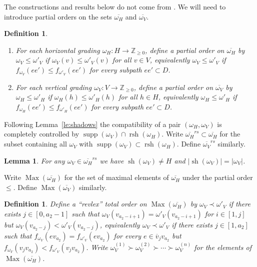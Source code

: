\documentclass{amsart}
\newtheorem{definition}[theorem]{Definition}
\newtheorem{lemma}[theorem]{Lemma}
\newcommand{\ZZ}{\mathbb{Z}}
\newcommand{\supp}{\operatorname{supp}}
\newcommand{\Max}{\operatorname{Max}}
\newcommand{\rsh}{\operatorname{rsh}}
\newcommand{\sh}{\operatorname{sh}}
\newenvironment{enumeratea}{\begin{enumerate}[\upshape (a)]}
                           {\end{enumerate}}
\begin{document}
 The constructions and results below do not come from \cite{llz}.  We will need to introduce partial orders on the sets $\overline{\omega_H}$ and $\overline{\omega_V}$.
 \begin{definition}\label{def:partial_order}\mbox{}
  \begin{enumeratea}
   \item For each horizontal grading $\omega_H:H\to\ZZ_{\ge0}$, define a partial order on $\overline{\omega_H}$ by $\omega_V\le \omega'_V$ if $\omega_V(v)\le\omega'_V(v)$ for all $v\in V$, equivalently $\omega_V\le\omega'_V$ if $f_{\omega_V}(ee')\le f_{\omega'_V}(ee')$ for every subpath $ee'\subset D$.
   \item For each vertical grading $\omega_V:V\to\ZZ_{\ge0}$, define a partial order on $\overline{\omega_V}$ by $\omega_H\le \omega'_H$ if $\omega_H(h)\le\omega'_H(h)$ for all $h\in H$, equivalently $\omega_H\le\omega'_H$ if $f_{\omega_H}(ee')\le f_{\omega'_H}(ee')$ for every subpath $ee'\subset D$.
  \end{enumeratea}
 \end{definition}

 Following Lemma~\ref{le:shadows} the compatibility of a pair $(\omega_H,\omega_V)$ is completely controlled by $\supp(\omega_V)\cap\rsh(\omega_H)$.  Write $\overline{\omega_H}^{rs}\subset\overline{\omega_H}$ for the subset containing all $\omega_V$ with $\supp(\omega_V)\subset\rsh(\omega_H)$.  Define $\overline{\omega_V}^{rs}$ similarly.

 \begin{lemma}\label{lem:shadow_magnitude}
  For any $\omega_V\in\overline{\omega_H}^{rs}$ we have $\sh(\omega_V)\ne H$ and $|\sh(\omega_V)|=|\omega_V|$.
 \end{lemma}

 Write $\Max(\overline{\omega_H})$ for the set of maximal elements of $\overline{\omega_H}$ under the partial order $\le$.  Define $\Max(\overline{\omega_V})$ similarly.
 \begin{definition}
  Define a ``revlex'' total order on $\Max(\overline{\omega_H})$ by $\omega_V\prec\omega'_V$ if there exists $j\in[0,a_2-1]$ such that $\omega_V(v_{a_2-i+1})=\omega'_V(v_{a_2-i+1})$ for $i\in[1,j]$ but $\omega_V(v_{a_2-j})<\omega'_V(v_{a_2-j})$, equivalently $\omega_V\prec\omega'_V$ if there exists $j\in[1,a_2]$ such that $f_{\omega_V}(ev_{a_2})=f_{\omega'_V}(ev_{a_2})$ for every $e\in\overline{v}_jv_{a_2}$ but $f_{\omega_V}(v_jv_{a_2})<f_{\omega'_V}(v_jv_{a_2})$.  Write $\omega_V^{(1)}\succ \omega_V^{(2)}\succ\cdots\succ \omega_V^{(n)}$ for the elements of $\Max(\overline{\omega_H})$.
 \end{definition}
\end{document}
